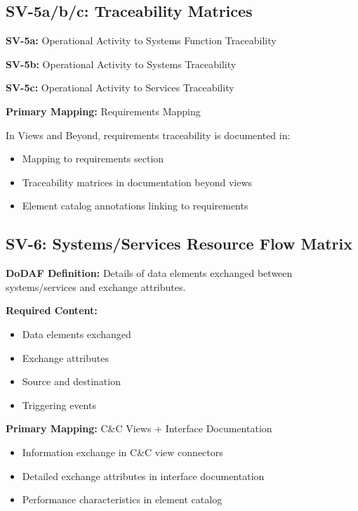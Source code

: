\documentclass[11pt]{article}
\begin{document}
\subsection{SV-5a/b/c: Traceability Matrices}

\begin{dodafbox}
\textbf{SV-5a:} Operational Activity to Systems Function Traceability

\textbf{SV-5b:} Operational Activity to Systems Traceability

\textbf{SV-5c:} Operational Activity to Services Traceability
\end{dodafbox}

\begin{vbbox}
\textbf{Primary Mapping:} Requirements Mapping

In Views and Beyond, requirements traceability is documented in:
\begin{itemize}
    \item Mapping to requirements section
    \item Traceability matrices in documentation beyond views
    \item Element catalog annotations linking to requirements
\end{itemize}
\end{vbbox}

\subsection{SV-6: Systems/Services Resource Flow Matrix}

\begin{dodafbox}
\textbf{DoDAF Definition:} Details of data elements exchanged between systems/services and exchange attributes.

\textbf{Required Content:}
\begin{itemize}[nosep]
    \item Data elements exchanged
    \item Exchange attributes
    \item Source and destination
    \item Triggering events
\end{itemize}
\end{dodafbox}

\begin{vbbox}
\textbf{Primary Mapping:} C\&C Views + Interface Documentation

\begin{itemize}
    \item Information exchange in C\&C view connectors
    \item Detailed exchange attributes in interface documentation
    \item Performance characteristics in element catalog
\end{itemize}
\end{vbbox}
\end{document}
